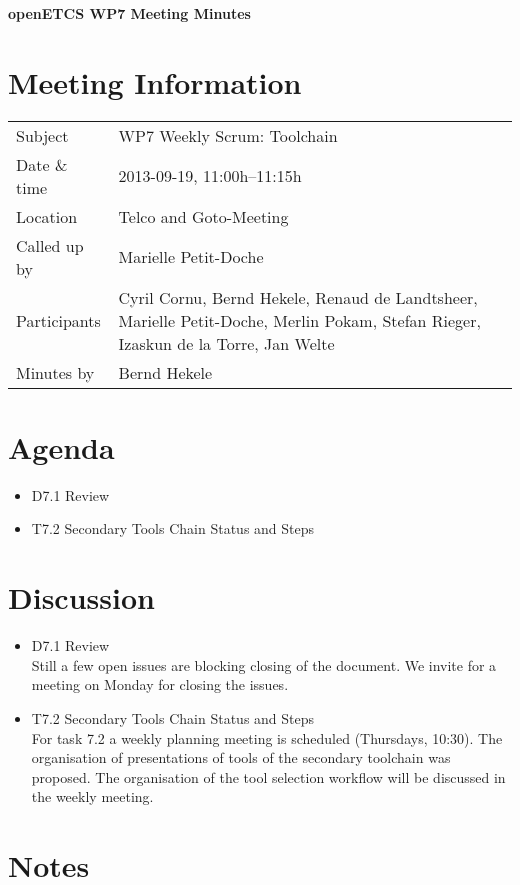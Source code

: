 \documentclass[a4paper, 11pt]{article}
\begin{document}
{\begin{center}\huge\bf openETCS WP7 Meeting Minutes\end{center}}
\section{Meeting Information}

\renewcommand{\arraystretch}{1.5}
\begin{supertabular}{m{.2\textwidth}m{.8\textwidth}}
Subject & WP7 Weekly Scrum: Toolchain\\
Date \& time & 2013-09-19, 11:00h--11:15h\\
Location & Telco and Goto-Meeting\\
Called up by & 
Marielle Petit-Doche\\
Participants &
Cyril Cornu,
Bernd Hekele,
Renaud de Landtsheer,
Marielle Petit-Doche,
Merlin Pokam,
Stefan Rieger,
Izaskun de la Torre,
Jan Welte\\


Minutes by & Bernd Hekele\\

\end{supertabular}
\renewcommand{\arraystretch}{1.0}


\section{Agenda}
\begin{itemize}
\item D7.1 Review
\item T7.2 Secondary Tools Chain Status and Steps
\end{itemize}

\section{Discussion}

\begin{itemize}
\item D7.1 Review\\
Still a few open issues are blocking closing of the document. We invite for a meeting on Monday for closing the issues.\\

\item T7.2 Secondary Tools Chain Status and Steps\\
For task 7.2 a weekly planning meeting is scheduled (Thursdays, 10:30). 
The organisation of presentations of tools of the secondary toolchain was proposed. 
The organisation of the tool selection workflow will be discussed in the weekly meeting.\\

\end{itemize}

\section{Notes}
\end{document}
